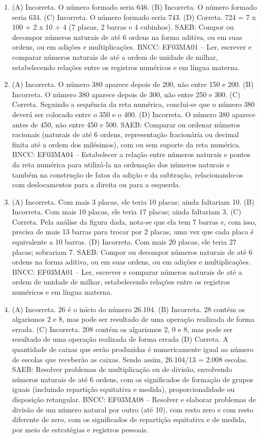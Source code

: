 \begin{enumerate}
\item
(A) Incorreta. O número formado seria 646.
(B) Incorreta. O número formado seria 634.
(C) Incorreta. O número formado seria 743.
(D) Correta. 724 = 7 x 100 + 2 x 10 + 4 (7 placas, 2 barras e 4 cubinhos).
SAEB: Compor ou decompor números naturais de até 6 ordens na forma aditiva, ou em suas ordens, ou em adições e multiplicações.
BNCC: EF03MA01 -- Ler, escrever e comparar números naturais de até a ordem de unidade de milhar, estabelecendo relações entre os registros numéricos e em língua materna.

\item
(A) Incorreta. O número 380 aparece depois de 200, não entre 150 e 200.
(B) Incorreta. O número 380 aparece depois de 300, não entre 250 e 300.
(C) Correta. Seguindo a sequência da reta numérica, conclui-se que o número 380 deverá ser colocado entre o 350 e o 400.
(D) Incorreta. O número 380 aparece antes de 450, não entre 450 e 500.
SAEB: Comparar ou ordenar números racionais (naturais de até 6 ordens, representação fracionária ou decimal finita até a ordem dos milésimos), com ou sem suporte da reta numérica.
BNCC: EF03MA04 -- Estabelecer a relação entre números naturais e pontos da reta numérica para
utilizá-la na ordenação dos números naturais e também na construção de fatos da adição e da
subtração, relacionando-os com deslocamentos para a direita ou para a esquerda.

\item
(A) Incorreta. Com mais 3 placas, ele teria 10 placas; ainda faltariam 10.
(B) Incorreta. Com mais 10 placas, ele teria 17 placas; ainda faltariam 3.
(C) Correta. Pela análise da figura dada, nota-se que ela tem 7 barras e, com isso,
precisa de mais 13 barras para trocar por 2 placas, uma vez que cada placa é equivalente a 10 barras.
(D) Incorreta. Com mais 20 placas, ele teria 27 placas; sobrariam 7.
SAEB: Compor ou decompor números naturais de até 6 ordens na forma aditiva, ou em suas ordens, ou em adições e multiplicações.
BNCC: EF03MA01 -- Ler, escrever e comparar números naturais de até a ordem de unidade de milhar, estabelecendo relações entre os registros numéricos e em língua materna.

\item
(A) Incorreta. 26 é o início do número 26.104.
(B) Incorreta. 28 contém os algarismos 2 e 8, mas pode ser resultado de uma operação realizada de forma errada.
(C) Incorreta. 208 contém os algarismos 2, 0 e 8, mas pode ser resultado de uma operação realizada de forma errada
(D) Correta. A quantidade de caixas que serão produzidas é numericamente igual ao número de
escolas que receberão as caixas. Sendo assim, 26.104/13 = 2.008 escolas.
SAEB: Resolver problemas de multiplicação ou de divisão, envolvendo números naturais de até 6 ordens, com os significados de formação de grupos iguais (incluindo repartição equitativa e medida), proporcionalidade ou disposição retangular.
BNCC: EF03MA08 -- Resolver e elaborar problemas de divisão de um número natural por outro (até
10), com resto zero e com resto diferente de zero, com os significados de repartição equitativa
e de medida, por meio de estratégias e registros pessoais.


\end{enumerate}
